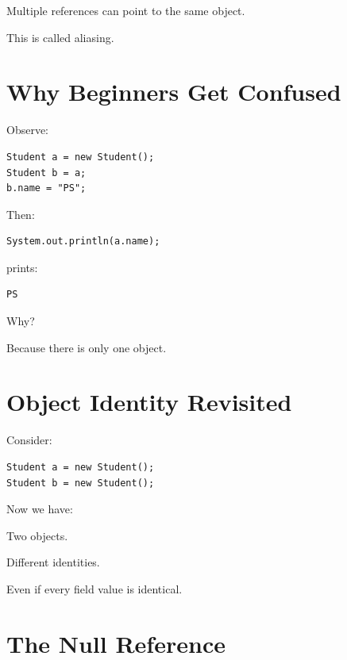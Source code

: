 \documentclass[11pt,a4paper]{book}
\begin{document}
\begin{idea}

Multiple references can point to the same object.

\end{idea}

This is called aliasing.


\section{Why Beginners Get Confused}

Observe:

\begin{verbatim}
Student a = new Student();
Student b = a;
b.name = "PS";
\end{verbatim}

Then:

\begin{verbatim}
System.out.println(a.name);
\end{verbatim}

prints:

\begin{verbatim}
PS
\end{verbatim}

Why?

Because there is only one object.


\section{Object Identity Revisited}

Consider:

\begin{verbatim}
Student a = new Student();
Student b = new Student();
\end{verbatim}

Now we have:

Two objects.

Different identities.

Even if every field value is identical.


\section{The Null Reference}
\end{document}
